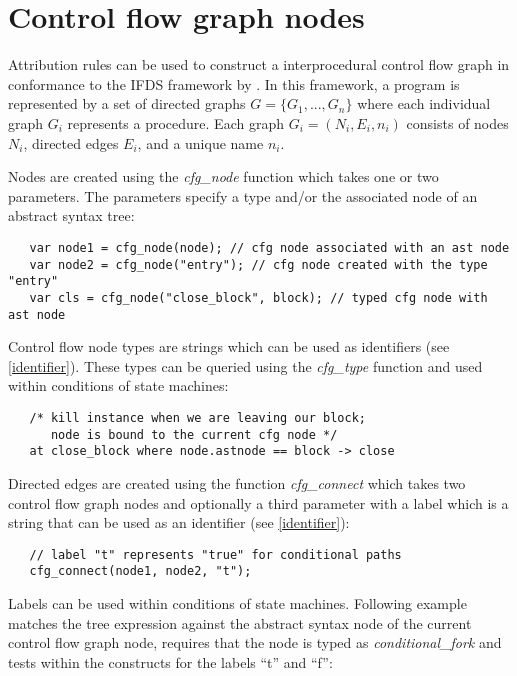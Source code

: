 \section{Control flow graph nodes}

Attribution rules can be used to construct a interprocedural control
flow graph in conformance to the IFDS framework by
\cite{Reps:1995}. In this framework, a program is represented by a
set of directed graphs $G = \{G_1, ..., G_n\}$ where each individual
graph $G_i$ represents a procedure. Each graph $G_i = (N_i, E_i, n_i)$
consists of nodes $N_i$, directed edges $E_i$, and a unique name $n_i$.

Nodes are created using the \textit{cfg\_node} function
which takes one or two parameters. The parameters specify a type and/or
the associated node of an abstract syntax tree:

\begin{lstlisting}
   var node1 = cfg_node(node); // cfg node associated with an ast node
   var node2 = cfg_node("entry"); // cfg node created with the type "entry"
   var cls = cfg_node("close_block", block); // typed cfg node with ast node
\end{lstlisting}

Control flow node types are strings which
can be used as identifiers (see \ref{identifier}). These types can be
queried using the \textit{cfg\_type} function and used
within conditions of state machines:

\begin{lstlisting}
   /* kill instance when we are leaving our block;
      node is bound to the current cfg node */
   at close_block where node.astnode == block -> close
\end{lstlisting}

Directed edges are created using the function
\textit{cfg\_connect} which takes two control flow
graph nodes and optionally a third parameter with a label which is a
string that can be used as an identifier (see \ref{identifier}):

\begin{lstlisting}
   // label "t" represents "true" for conditional paths
   cfg_connect(node1, node2, "t");
\end{lstlisting}

Labels can be used within conditions of state machines.
Following example matches the tree expression against
the abstract syntax node of the current control flow
graph node, requires that the node is typed as
\textit{conditional\_fork} and tests within the
 constructs for the labels ``t'' and ``f'':

